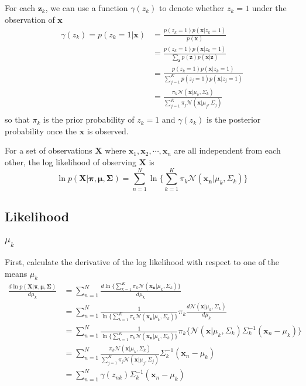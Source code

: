 \documentclass{article}
\begin{document}
\par\noindent
For each \(\mathbf{z}_k\), we can use a function \(\gamma(z_k)\) to 
denote whether \(z_k=1\) under the observation of \(\mathbf{x}\)
\begin{align*}
    \gamma(z_k) = p(z_k=1|\mathbf{x})
    &= \frac{p(z_k=1)p(\mathbf{x}|z_k=1)}{p(\mathbf{x})}\\
    &= \frac{p(z_k=1)p(\mathbf{x}|z_k=1)}{\sum_{\mathbf{z}}^{}p(\mathbf{z})p(\mathbf{x}|\mathbf{z})}\\
    &= \frac{p(z_k=1)p(\mathbf{x}|z_k=1)}{\sum_{j=1}^{K}p(z_j=1)p(\mathbf{x}|z_j=1)}\\
    &= \frac{\pi_k\mathcal{N}(\mathbf{x}|\mu_k, \Sigma_k)}{\sum_{j=1}^{K}\pi_j\mathcal{N}(\mathbf{x}|\mu_j, \Sigma_j)}\\
\end{align*}
so that \(\pi_k\) is the prior probability of \(z_k=1\) and \(\gamma(z_k)\)
is the posterior probability once the \(\mathbf{x}\) is observed.
\bigskip

\par\noindent
For a set of observations \(\mathbf{X}\) where \(\mathbf{x}_1, \mathbf{x}_2, \cdots, \mathbf{x}_n\)
are all independent from each other, the log likelihood of observing
\(\mathbf{X}\) is
\[
\ln{p(\mathbf{X}|\mathbf{\pi},\mathbf{\mu},\mathbf{\Sigma})}
=\sum_{n=1}^{N}\ln{\{\sum_{k=1}^{K}\pi_k\mathcal{N}(\mathbf{x_n}|\mu_k, \Sigma_k)\}}
\]

\subsection{Likelihood}
\subsubsection{\(\mu_k\)}
\par\noindent
First, calculate the derivative of the log likelihood with respect to one of the means \(\mu_k\)
\begin{align*}
    \frac{d\ln{p(\mathbf{X}|\mathbf{\pi},\mathbf{\mu},\mathbf{\Sigma})}}{d\mu_k}
    &= \sum_{n=1}^{N} \frac{d\ln{\{\sum_{k=1}^{K}\pi_k\mathcal{N}(\mathbf{x_n}|\mu_k, \Sigma_k)\}}}{d\mu_k}\\
    &= \sum_{n=1}^{N} \frac{1}{\ln{\{\sum_{k=1}^{K}\pi_k\mathcal{N}(\mathbf{x_n}|\mu_k, \Sigma_k)\}}}\pi_k\frac{d\mathcal{N}(\mathbf{x}|\mu_k, \Sigma_k)}{d\mu_k}\\
    &= \sum_{n=1}^{N} \frac{1}{\ln{\{\sum_{k=1}^{K}\pi_k\mathcal{N}(\mathbf{x_n}|\mu_k, \Sigma_k)\}}}\pi_k\{\mathcal{N}(\mathbf{x}|\mu_k, \Sigma_k)\Sigma_k^{-1}(\mathbf{x}_n-\mu_k)\}\\
    &= \sum_{n=1}^{N} \frac{\pi_k\mathcal{N}(\mathbf{x}|\mu_k, \Sigma_k)}{\sum_{j=1}^{K}\pi_j\mathcal{N}(\mathbf{x}|\mu_j, \Sigma_j)}\Sigma_k^{-1}(\mathbf{x}_n-\mu_k)\\
    &= \sum_{n=1}^{N} \gamma(z_{nk})\Sigma_k^{-1}(\mathbf{x}_n-\mu_k)
\end{align*}
\bigskip
\end{document}
